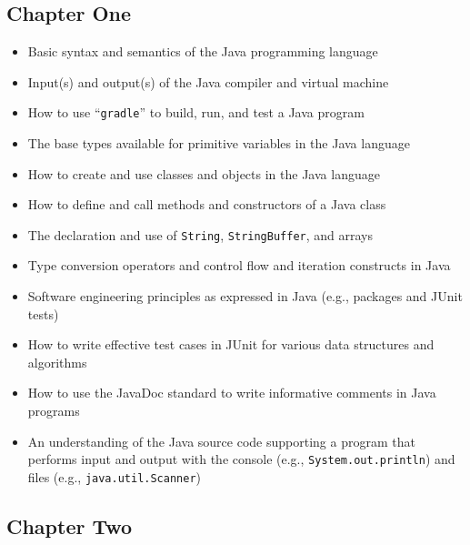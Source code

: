 \documentclass[11pt]{article}
\newcommand{\command}[1]{``\lstinline{#1}''}
\newcommand{\program}[1]{\lstinline{#1}}
\begin{document}
\subsection*{Chapter One}

\begin{itemize}

  \item Basic syntax and semantics of the Java programming language
  \item Input(s) and output(s) of the Java compiler and virtual machine
  \item How to use \command{gradle} to build, run, and test a Java program
  \item The base types available for primitive variables in the Java language
  \item How to create and use classes and objects in the Java language
  \item How to define and call methods and constructors of a Java class
  \item The declaration and use of \program{String}, \program{StringBuffer}, and arrays
  \item Type conversion operators and control flow and iteration constructs in Java
  \item Software engineering principles as expressed in Java (e.g., packages and
    JUnit tests)
  \item How to write effective test cases in JUnit for various data structures
    and algorithms
  \item How to use the JavaDoc standard to write informative
    comments in Java programs
  \item An understanding of the Java source code supporting a program that
    performs input and output with the console (e.g.,
    \program{System.out.println}) and files (e.g., \program{java.util.Scanner})

\end{itemize}

\vspace*{-.2in}
\subsection*{Chapter Two}
\end{document}
